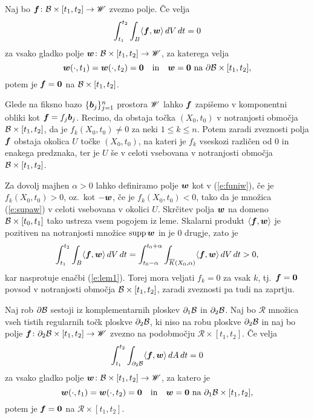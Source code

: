 \begin{lema}\label{l:1}
	Naj bo $\boldsymbol f\colon\mathcal B\times [t_1,t_2]\to\mathscr W$ zvezno polje. Če velja
	\begin{equation}\label{e:lem1}
		\int_{t_1}^{t_2}\int_B\langle\boldsymbol f,\boldsymbol w\rangle\,dV\,dt = 0
	\end{equation}
	za vsako gladko polje $\boldsymbol w\colon\mathcal B\times[t_1,t_2]\to\mathscr W$, za katerega velja
	\[
		\boldsymbol w(\cdot,t_1)=\boldsymbol w(\cdot,t_2)=\boldsymbol 0\quad\textrm{in}
		\quad\boldsymbol w=\boldsymbol 0\ \textrm{na}\ \partial \mathcal B\times[t_1,t_2],
	\]
	potem je $\boldsymbol f=\boldsymbol 0$ na $\mathcal B\times [t_1,t_2]$.
\end{lema}

\proof
	Glede na fiksno bazo $\{\boldsymbol b_j\}_{j=1}^n$ prostora $\mathscr W$ lahko $\boldsymbol f$
	zapišemo v komponentni obliki kot $\boldsymbol f=f_j\boldsymbol b_j$.
	Recimo, da obstaja točka $(X_0,t_0)$ v notranjosti območja $\mathcal B\times[t_1,t_2]$, da je $f_{k}(X_0,t_0)\neq 0$
	za neki $1\leq k\leq n$. Potem zaradi zveznosti polja $\boldsymbol f$
	obstaja okolica $U$ točke $(X_0,t_0)$, na kateri je $f_k$
	vseskozi različen od 0 in enakega predznaka, ter
	je $U$ še v celoti vsebovana v notranjosti območja $\mathcal B\times[t_1,t_2]$.
	
	Za dovolj majhen $\alpha>0$ lahko definiramo polje
	$\boldsymbol w$ kot v (\ref{e:funiw}), če je $f_{k}(X_0,t_0) > 0$, oz.~kot $-\boldsymbol w$,
	če je $f_{k}(X_0,t_0) < 0$, tako da je množica (\ref{e:supaw}) v celoti vsebovana v okolici $U$.
	Skrčitev polja $\boldsymbol w$ na domeno $\mathcal B\times[t_0,t_1]$ tako ustreza vsem pogojem iz leme.
	Skalarni produkt $\langle\boldsymbol f,\boldsymbol w\rangle$ je pozitiven na notranjosti množice
	$\mathrm{supp}\,\boldsymbol w$ in je 0 drugje, zato je
	\[
		\int_{t_1}^{t_2}\int_B \langle\boldsymbol f,\boldsymbol w\rangle\,dV\,dt=
		\int_{t_0-\alpha}^{t_0+\alpha}\int_{\overline{K}(X_0,\alpha)} \langle\boldsymbol f,\boldsymbol w\rangle\,dV\,dt> 0,
	\]
	kar nasprotuje enačbi (\ref{e:lem1}). Torej mora veljati $f_k=0$ za vsak $k$,
	tj.~$\boldsymbol f=\boldsymbol 0$ povsod v notranjosti območja $\mathcal B\times [t_1,t_2]$,
	zaradi zveznosti pa tudi na zaprtju.
\endproof

\begin{lema}\label{l:2}
	Naj rob $\partial\mathcal B$ sestoji iz komplementarnih ploskev $\partial_1 \mathcal B$ in
	$\partial_2 \mathcal B$. Naj bo $\mathcal{R}$ množica vseh tistih regularnih točk ploskve $\partial_2\mathcal B$,
	ki niso na robu ploskve $\partial_2\mathcal B$ in naj bo 
	polje $\boldsymbol f\colon \partial_2\mathcal B\times[t_1,t_2]\to \mathscr W$ zvezno na podobmočju $\mathcal{R}\times[t_1,t_2]$.
	Če velja
	\begin{equation}\label{e:lem2}
		\int_{t_1}^{t_2}\int_{\partial_2\mathcal B} \langle\boldsymbol f,\boldsymbol w\rangle\,dA\,dt = 0
	\end{equation}
	za vsako gladko polje $\boldsymbol w\colon\mathcal B\times[t_1,t_2]\to\mathscr W$, za katero je
	\[
		\vek{w}(\cdot,t_1)=\vek{w}(\cdot,t_2)=\vek{0}\quad\textrm{in}
		\quad\vek{w}=\vek{0}\ \textrm{na}\ \partial_1\B\times[t_1,t_2],
	\]
	potem je $\boldsymbol f=\boldsymbol 0$ na $\mathcal{R}\times [t_1,t_2]$.
\end{lema}

